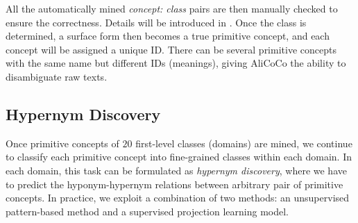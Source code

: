 
All the automatically mined \textit{concept: class} pairs are then manually checked to ensure the correctness. 
Details will be introduced in . 
Once the class is determined, a surface form then becomes a true primitive concept, and each concept will be assigned a unique ID.
There can be several primitive concepts with the same name but different IDs (meanings), 
giving AliCoCo the ability to disambiguate raw texts.



\subsection{Hypernym Discovery}
\label{sec:isa}
Once primitive concepts of $20$ first-level classes (domains) are mined,
we continue to classify each primitive concept into fine-grained classes within each domain.
In each domain, this task can be formulated as \textit{hypernym discovery}, 
where we have to predict the hyponym-hypernym relations between arbitrary pair of primitive concepts.
In practice, we exploit a combination of two methods: 
an unsupervised pattern-based method and a supervised projection learning model.

